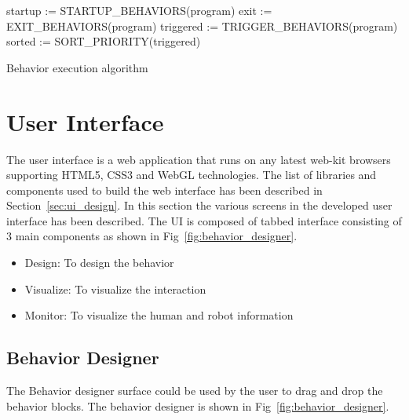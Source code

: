 \begin{algorithm}[H]
 startup := STARTUP\_BEHAVIORS(program)\;
 exit := EXIT\_BEHAVIORS(program)\;
 triggered := TRIGGER\_BEHAVIORS(program)\;
 sorted := SORT\_PRIORITY(triggered)\;
 \caption{Behavior execution algorithm}
 \label{alg:behavior_engine}
\end{algorithm}

\section{User Interface}
\label{ssec:ui_comp}
The user interface is a web application that runs on any latest web-kit browsers supporting HTML5, CSS3 and WebGL technologies. The list of libraries and components used to build the web interface has been described in Section~\ref{sec:ui_design}. In this section the various screens in the developed user interface has been described. The UI is composed of tabbed interface consisting of 3 main components as shown in Fig~\ref{fig:behavior_designer}.
\begin{itemize}
\item Design: To design the behavior
\item Visualize: To visualize the interaction
\item Monitor: To visualize the human and robot information
\end{itemize}

\subsection*{Behavior Designer} The Behavior designer surface could be used by the user to drag and drop the behavior blocks. The behavior designer is shown in Fig~\ref{fig:behavior_designer}.


